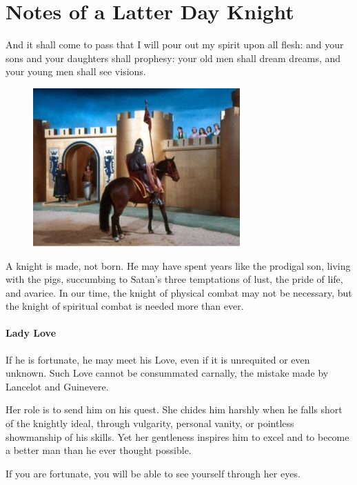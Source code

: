 \section{Notes of a Latter Day Knight}

\begin{quotex}
And it shall come to pass that I will pour out my spirit upon all flesh: and your sons and your daughters shall prophesy: your old men shall dream dreams, and your young men shall see visions. 

\end{quotex}

\begin{figure}
 \includegraphics[scale=.5]{a20190313NotesofaLatterDayKnight-img001.jpg}
 \end{figure}

A knight is made, not born. He may have spent years like the prodigal son, living with the pigs, succumbing to Satan's three temptations of lust, the pride of life, and avarice. In our time, the knight of physical combat may not be necessary, but the knight of spiritual combat is needed more than ever.

\paragraph{Lady Love}
If he is fortunate, he may meet his Love, even if it is unrequited or even unknown. Such Love cannot be consummated carnally, the mistake made by Lancelot and Guinevere.

Her role is to send him on his quest. She chides him harshly when he falls short of the knightly ideal, through vulgarity, personal vanity, or pointless showmanship of his skills. Yet her gentleness inspires him to excel and to become a better man than he ever thought possible.

If you are fortunate, you will be able to see yourself through her eyes.

